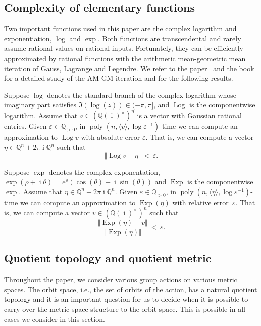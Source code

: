 \documentclass[a4paper,USenglish,cleveref,numberwithinsect]{lipics-v2021}
\DeclareMathOperator{\poly}{poly}
\DeclareMathOperator{\ii}{i}
\DeclareMathOperator{\Log}{Log}
\DeclareMathOperator{\Exp}{Exp}
\newcommand{\QQ}{\mathbb{Q}}
\numberwithin{equation}{section}
\begin{document}
\subsection{Complexity of elementary functions}
Two important functions used in this paper are the complex logarithm and exponentiation, $\log$ and $\exp$.
Both functions are transcendental and rarely assume rational values on rational inputs.
Fortunately, they can be efficiently approximated by rational functions with
the arithmetic mean-geometric mean iteration of Gauss, Lagrange and Legendre.
We refer to the paper~\cite{BorweinBorwein:88} and the book~\cite{agm} for a detailed study of the AM-GM iteration
and for the following results.

\begin{lemma}
\label{lem:log}
 Suppose $\log$ denotes the standard branch of the complex logarithm whose imaginary part satisfies $\Im(\log(z))\in (-\pi,\pi]$, and $\Log$ is the componentwise logarithm. Assume that $v\in(\QQ(\ii)^\times)^n$ is a vector with Gaussian rational entries.
 Given $\varepsilon\in\QQ_{>0}$, in $\poly(n,\langle v\rangle,\log\varepsilon^{-1})$-time we can compute an approximation to
 $\Log v$ with absolute error $\varepsilon$. That is, we can compute a vector $\eta\in\QQ^n+2\pi\ii\QQ^n$ such that
 \[
	\Vert \Log v-\eta\Vert\,<\,\varepsilon.
 \]
\end{lemma}

\begin{lemma}
\label{lem:exp}
 Suppose $\exp$ denotes the complex exponentation, $\exp(\rho+\ii\theta)=e^{\rho}(\cos(\theta)+\ii\sin(\theta))$ and
 $\Exp$ is the componentwise $\exp$. Assume that $\eta\in \QQ^n+2\pi\ii\QQ^n$.
 Given $\varepsilon\in\QQ_{>0}$, in $\poly(n,\langle \eta\rangle,\log\varepsilon^{-1})$-time
 we can compute an approximation to $\Exp(\eta)$ with relative error~$\varepsilon$.
 That is, we can compute a vector $v\in(\QQ(\ii)^\times)^n$ such that
 \[
	\frac{\Vert \Exp(\eta)-v\Vert}{\Vert \Exp(\eta)\Vert}\,<\,\varepsilon.
 \]
\end{lemma}

\subsection{Quotient topology and quotient metric}\label{sec:quotients}
Throughout the paper, we consider various group actions on various metric spaces. The orbit space, i.e.,
the set of orbits of the action, has a natural quotient topology and it is an important question for us to decide
when it is possible to carry over the metric space structure to the orbit space.
This is possible in all cases we consider in this section.
\end{document}
